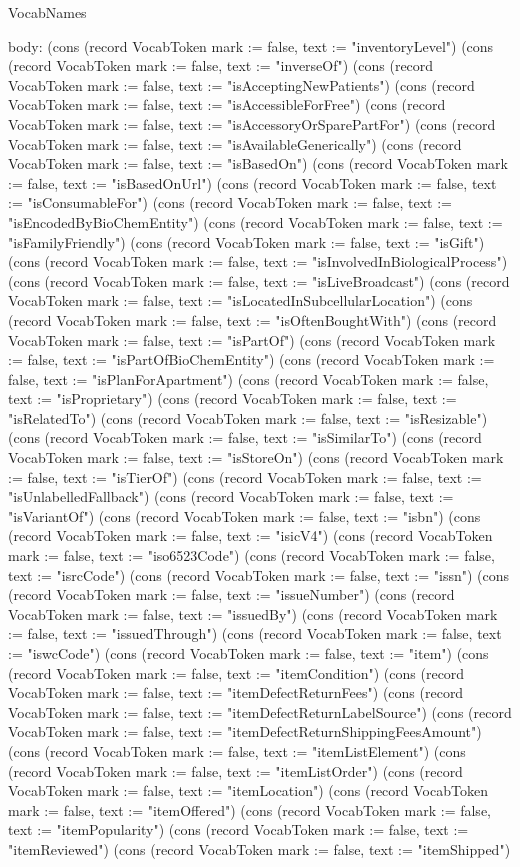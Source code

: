 \begin{lexlean}{VocabNames}
\begin{semanticmodule}
{  body: (cons (record VocabToken {mark := false, text := "inventoryLevel"}) (cons (record VocabToken {mark := false, text := "inverseOf"}) (cons (record VocabToken {mark := false, text := "isAcceptingNewPatients"}) (cons (record VocabToken {mark := false, text := "isAccessibleForFree"}) (cons (record VocabToken {mark := false, text := "isAccessoryOrSparePartFor"}) (cons (record VocabToken {mark := false, text := "isAvailableGenerically"}) (cons (record VocabToken {mark := false, text := "isBasedOn"}) (cons (record VocabToken {mark := false, text := "isBasedOnUrl"}) (cons (record VocabToken {mark := false, text := "isConsumableFor"}) (cons (record VocabToken {mark := false, text := "isEncodedByBioChemEntity"}) (cons (record VocabToken {mark := false, text := "isFamilyFriendly"}) (cons (record VocabToken {mark := false, text := "isGift"}) (cons (record VocabToken {mark := false, text := "isInvolvedInBiologicalProcess"}) (cons (record VocabToken {mark := false, text := "isLiveBroadcast"}) (cons (record VocabToken {mark := false, text := "isLocatedInSubcellularLocation"}) (cons (record VocabToken {mark := false, text := "isOftenBoughtWith"}) (cons (record VocabToken {mark := false, text := "isPartOf"}) (cons (record VocabToken {mark := false, text := "isPartOfBioChemEntity"}) (cons (record VocabToken {mark := false, text := "isPlanForApartment"}) (cons (record VocabToken {mark := false, text := "isProprietary"}) (cons (record VocabToken {mark := false, text := "isRelatedTo"}) (cons (record VocabToken {mark := false, text := "isResizable"}) (cons (record VocabToken {mark := false, text := "isSimilarTo"}) (cons (record VocabToken {mark := false, text := "isStoreOn"}) (cons (record VocabToken {mark := false, text := "isTierOf"}) (cons (record VocabToken {mark := false, text := "isUnlabelledFallback"}) (cons (record VocabToken {mark := false, text := "isVariantOf"}) (cons (record VocabToken {mark := false, text := "isbn"}) (cons (record VocabToken {mark := false, text := "isicV4"}) (cons (record VocabToken {mark := false, text := "iso6523Code"}) (cons (record VocabToken {mark := false, text := "isrcCode"}) (cons (record VocabToken {mark := false, text := "issn"}) (cons (record VocabToken {mark := false, text := "issueNumber"}) (cons (record VocabToken {mark := false, text := "issuedBy"}) (cons (record VocabToken {mark := false, text := "issuedThrough"}) (cons (record VocabToken {mark := false, text := "iswcCode"}) (cons (record VocabToken {mark := false, text := "item"}) (cons (record VocabToken {mark := false, text := "itemCondition"}) (cons (record VocabToken {mark := false, text := "itemDefectReturnFees"}) (cons (record VocabToken {mark := false, text := "itemDefectReturnLabelSource"}) (cons (record VocabToken {mark := false, text := "itemDefectReturnShippingFeesAmount"}) (cons (record VocabToken {mark := false, text := "itemListElement"}) (cons (record VocabToken {mark := false, text := "itemListOrder"}) (cons (record VocabToken {mark := false, text := "itemLocation"}) (cons (record VocabToken {mark := false, text := "itemOffered"}) (cons (record VocabToken {mark := false, text := "itemPopularity"}) (cons (record VocabToken {mark := false, text := "itemReviewed"}) (cons (record VocabToken {mark := false, text := "itemShipped"}) }
\end{semanticmodule}
\end{lexlean}

